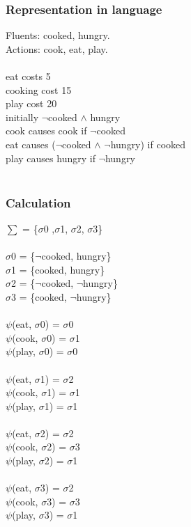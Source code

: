 \documentclass[11pt]{article}
\begin{document}
	\subsubsection{Representation in language}\label{par:p203}
	Fluents: cooked, hungry.\\
	Actions: cook, eat, play.\\
	\\
	eat costs 5\\
	cooking cost 15\\
	play cost 20\\
	initially $\neg$cooked $\land$ hungry\\
	cook causes cook if $\neg$cooked\\
	eat causes ($\neg$cooked $\land$ $\neg$hungry) if cooked\\
	play causes hungry if $\neg$hungry\\
	\\
	\subsubsection{Calculation}\label{par:p303}
	$\sum$ = \{$\sigma$0 ,$\sigma$1, $\sigma$2, $\sigma$3\}\\
	\\
	$\sigma$0 = \{$\neg$cooked, hungry\}\\
	$\sigma$1 = \{cooked, hungry\}\\
	$\sigma$2 = \{$\neg$cooked, $\neg$hungry\}\\
	$\sigma$3 = \{cooked, $\neg$hungry\}\\
	\\
	$\psi$(eat, $\sigma$0) = $\sigma$0\\
	$\psi$(cook, $\sigma$0) = $\sigma$1\\
	$\psi$(play, $\sigma$0) = $\sigma$0\\
	\\
	$\psi$(eat, $\sigma$1) = $\sigma$2\\
	$\psi$(cook, $\sigma$1) = $\sigma$1\\
	$\psi$(play, $\sigma$1) = $\sigma$1\\
	\\
	$\psi$(eat, $\sigma$2) = $\sigma$2\\
	$\psi$(cook, $\sigma$2) = $\sigma$3\\
	$\psi$(play, $\sigma$2) = $\sigma$1\\
	\\
	$\psi$(eat, $\sigma$3) = $\sigma$2\\
	$\psi$(cook, $\sigma$3) = $\sigma$3\\
	$\psi$(play, $\sigma$3) = $\sigma$1\\
	\\
\end{document}
